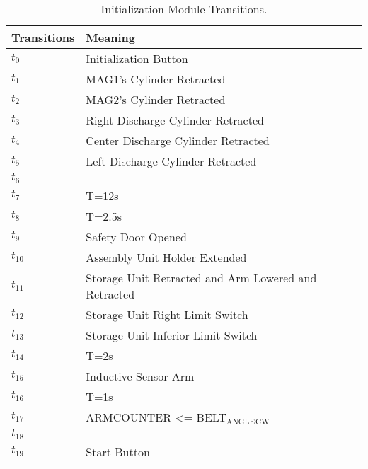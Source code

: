 \begin{table}[H]
\caption{Initialization Module Transitions.}
\centering
\begin{tabular}{M{5cm}M{10cm}}
Transitions & Meaning\\
\hline
\hyperlink{partialNet:t01}{\hypertarget{partialTable:t0}{$t_{0}$}} & Initialization Button\\
\hyperlink{partialNet:t11}{\hypertarget{partialTable:t1}{$t_{1}$}} & MAG1's Cylinder Retracted\\
\hyperlink{partialNet:t21}{\hypertarget{partialTable:t2}{$t_{2}$}} & MAG2's Cylinder Retracted\\
\hyperlink{partialNet:t31}{\hypertarget{partialTable:t3}{$t_{3}$}} & Right Discharge Cylinder Retracted\\
\hyperlink{partialNet:t41}{\hypertarget{partialTable:t4}{$t_{4}$}} & Center Discharge Cylinder Retracted\\
\hyperlink{partialNet:t51}{\hypertarget{partialTable:t5}{$t_{5}$}} & Left Discharge Cylinder Retracted\\
\hyperlink{partialNet:t61}{\hypertarget{partialTable:t6}{$t_{6}$}} & \\
\hyperlink{partialNet:tt71}{\hypertarget{partialTable:tt7}{$t_{7}$}} & T=12s\\
\hyperlink{partialNet:tt81}{\hypertarget{partialTable:tt8}{$t_{8}$}} & T=2.5s\\
\hyperlink{partialNet:t91}{\hypertarget{partialTable:t9}{$t_{9}$}} & Safety Door Opened\\
\hyperlink{partialNet:t101}{\hypertarget{partialTable:t10}{$t_{10}$}} & Assembly Unit Holder Extended\\
\hyperlink{partialNet:t111}{\hypertarget{partialTable:t11}{$t_{11}$}} & Storage Unit Retracted and Arm Lowered and Retracted\\
\hyperlink{partialNet:t121}{\hypertarget{partialTable:t12}{$t_{12}$}} & Storage Unit Right Limit Switch\\
\hyperlink{partialNet:t131}{\hypertarget{partialTable:t13}{$t_{13}$}} & Storage Unit Inferior Limit Switch\\
\hyperlink{partialNet:tt141}{\hypertarget{partialTable:tt14}{$t_{14}$}} & T=2s\\
\hyperlink{partialNet:t151}{\hypertarget{partialTable:t15}{$t_{15}$}} & Inductive Sensor Arm\\
\hyperlink{partialNet:tt161}{\hypertarget{partialTable:tt16}{$t_{16}$}} & T=1s\\
\hyperlink{partialNet:t171}{\hypertarget{partialTable:t17}{$t_{17}$}} & ARMCOUNTER <= BELT\(_{\text{ANGLE}}\)\(_{\text{CW}}\)\\
\hyperlink{partialNet:t181}{\hypertarget{partialTable:t18}{$t_{18}$}} & \\
\hyperlink{partialNet:t191}{\hypertarget{partialTable:t19}{$t_{19}$}} & Start Button\\
\end{tabular}
\end{table}
